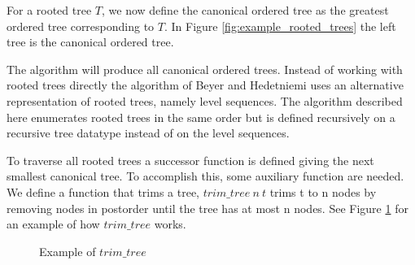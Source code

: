 For a rooted tree $T$, we now define the canonical ordered tree as the greatest ordered tree corresponding to $T$.
In Figure \ref{fig:example_rooted_trees} the left tree is the canonical ordered tree.

The algorithm will produce all canonical ordered trees.
Instead of working with rooted trees directly the algorithm of Beyer and Hedetniemi uses an alternative representation of rooted trees, namely level sequences.
The algorithm described here enumerates rooted trees in the same order but is defined recursively on a recursive tree datatype instead of on the level sequences.

To traverse all rooted trees a successor function is defined giving the next smallest canonical tree.
To accomplish this, some auxiliary function are needed.
We define a function that trims a tree, $trim\_tree\ n\ t$ trims t to n nodes by removing nodes in postorder until the tree has at most n nodes.
See Figure \ref{fig:trim_tree_example} for an example of how $trim\_tree$ works.

\begin{figure}[htpb]
\centering
{}
\caption{Example of $trim\_tree$}
\label{fig:trim_tree_example}
\end{figure}

